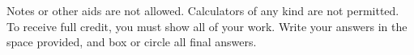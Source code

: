 %
%
Notes or other aids are not allowed. Calculators of any kind are not permitted.
To receive full credit, you must show all of your work. Write your answers in
the space provided, and box or circle all final answers.
